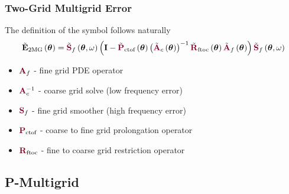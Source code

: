 \documentclass{beamer}
\begin{document}
\begin{frame}
\begin{center}
\frametitle{Two-Grid Multigrid Error}

The definition of the symbol follows naturally\\

\begin{equation}
\tilde{\mathbf{E}}_{\text{2MG}} \left( \boldsymbol{\theta} \right) = \tilde{{\color{burgundy}\mathbf{S}}}_f \left( \boldsymbol{\theta}, \omega \right) \left( \mathbf{I} - \tilde{{\color{burgundy}\mathbf{P}}}_{\text{ctof}} \left( \boldsymbol{\theta} \right) \left(\tilde{{\color{burgundy}\mathbf{A}}}_c \left( \boldsymbol{\theta} \right) \right)^{-1} \tilde{{\color{burgundy}\mathbf{R}}}_{\text{ftoc}} \left( \boldsymbol{\theta} \right) \tilde{{\color{burgundy}\mathbf{A}}}_f \left( \boldsymbol{\theta} \right) \right) \tilde{{\color{burgundy}\mathbf{S}}}_f \left( \boldsymbol{\theta}, \omega \right)
\end{equation}

\begin{itemize}

\item ${\color{burgundy}\mathbf{A}}_f$ - fine grid PDE operator

\item ${\color{burgundy}\mathbf{A}}_c^{-1}$ - coarse grid solve (low frequency error)

\item ${\color{burgundy}\mathbf{S}}_f$ - fine grid smoother (high frequency error)

\item ${\color{burgundy}\mathbf{P}}_{\text{ctof}}$ - coarse to fine grid prolongation operator

\item ${\color{burgundy}\mathbf{R}}_{\text{ftoc}}$ - fine to coarse grid restriction operator

\end{itemize}

\end{center}
\end{frame}


\subsection{P-Multigrid}
\end{document}
